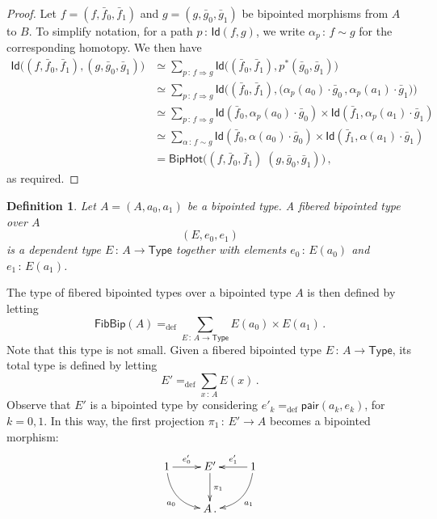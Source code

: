 \documentclass[10pt,a4paper,oneside,reqno]{amsart}
\theoremstyle{mythm}
\theoremstyle{mydef}
\newtheorem{definition}[theorem]{Definition}
\theoremstyle{myrmk}
\newcommand{\defeq}{=_{\mathrm{def}}}
\newcommand{\co}{\,{:}\,}
\newcommand{\ct}{\cdot}
\newcommand{\Id}{\mathsf{Id}}
\newcommand{\pair}{\mathsf{pair}}
\newcommand{\U}{\mathsf{Type}}
\newcommand{\BipHot}{\mathsf{BipHot}}
\newcommand{\FibBip}{\mathsf{FibBip}}
\begin{document}
\begin{proof} Let  $f = (f, \bar{f}_0, \bar{f}_1)$ and $g = (g, \bar{g}_0, \bar{g}_1)$ be bipointed
morphisms from $A$ to $B$. To simplify notation, for a path $p \co \Id( f, g)$, we write $\alpha_p \co f \sim g$
for the corresponding homotopy. We then have
\begin{align*}
 \Id \big( (f,\bar{f}_0,\bar{f}_1) , (g,\bar{g}_0,\bar{g}_1)  \big)
  &  \simeq \sum_{p \co  f \Rightarrow g} \Id \big(  (\bar{f}_0,\bar{f}_1),  p^{\ast} (\bar{g}_0,\bar{g}_1) \big) \\
  & \simeq
\sum_{p \co f \Rightarrow g} \Id\big( (\bar{f}_0,\bar{f}_1),  \big(\alpha_p(a_0) \ct \bar{g}_0 \, ,  \alpha_p(a_1) \ct \bar{g}_1) \big) \\
& \simeq \sum_{p  \co  f \Rightarrow g} \Id(\bar{f}_0, \alpha_p(a_0) \ct \bar{g}_0) \times \Id( \bar{f}_1, \alpha_p(a_1) \ct \bar{g}_1) \\
& \simeq \sum_{\alpha \co f \sim g} \Id(\bar{f}_0, \alpha(a_0) \ct \bar{g}_0) \times \Id(\bar{f}_1, \alpha(a_1) \ct \bar{g}_1) \\
& = \BipHot \big( (f,\bar{f}_0,\bar{f}_1) \; (g,\bar{g}_0,\bar{g}_1) \big) \, , 
\end{align*} 
as required.
\end{proof}





\begin{definition} \label{def:fibbipointed}
Let $A = (A, a_0, a_1)$ be a bipointed type. A \emph{fibered bipointed type over $A$}
\[
(E, e_0, e_1)
\]  
is a dependent type $E \co A \to \U$ together with elements $e_0 \co E(a_0)$ and $e_1 \co E(a_1)$.
\end{definition}

The type of  fibered bipointed types over a bipointed type $A$ is then defined by letting
\[
\FibBip(A) \defeq \sum_{E \co A \to \U} E(a_0) \times E(a_1)  \, .
 \]
 Note that this type is not small. 
Given a fibered bipointed type $E \co A \to \U$, its total type is defined by letting
\[
E'  \defeq \sum_{x \co A} E(x) \, .
\] 
Observe that $E'$ is a bipointed type by considering $e'_k \defeq \pair(a_k, e_k)$, 
for $k =  0, 1$. In this way, the first projection $\pi_1 \co E' \to A$ becomes a bipointed morphism:
\[
\xymatrix{
1 \ar@/_1pc/[dr]_{a_0} \ar[r]^-{e'_0} & E' \ar[d]^{\pi_1} & 1 \ar[l]_-{e'_1} \ar@/^1pc/[dl]^{a_1} \\ 
 & A \, .& }
 \]
\end{document}
